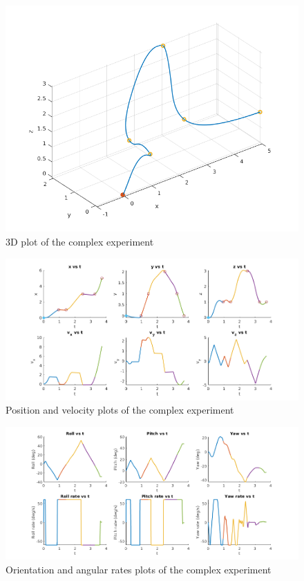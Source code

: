 \documentclass[letterpaper, 10 pt, conference]{ieeeconf}  %
\begin{document}
\begin{figure}[!htpb]
	\centering
	\includegraphics[width=1.0\linewidth]{Images/final_race/3d.png}
	\caption{3D plot of the complex experiment}
	\label{fig:final_3d}
\end{figure}
\begin{figure}[!htpb]
	\centering
	\includegraphics[width=1.0\linewidth]{Images/final_race/pos_vel.png}
	\caption{Position and velocity plots of the complex experiment}
	\label{fig:final_pos_vel}
\end{figure}
\begin{figure}[!htpb]
	\centering
	\includegraphics[width=1.0\linewidth]{Images/final_race/orient_rates.png}
	\caption{Orientation and angular rates plots of the complex experiment}
	\label{fig:final_orient_rates}
\end{figure}
\end{document}
